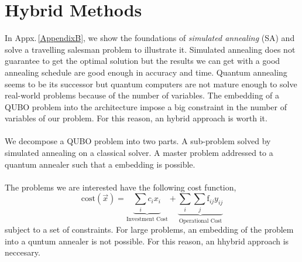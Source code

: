 
\chapter{Hybrid Methods} %

\label{Chapter3} %
In Appx.\,\ref{AppendixB}, we show the foundations of \textit{simulated annealing} (SA) and solve a travelling salesman problem to illustrate it. Simulated annealing does not guarantee to get the optimal solution but the results we can get with a good annealing schedule are good enough in accuracy and time. Quantum annealing seems to be its successor but quantum computers are not mature enough to solve real-world problems because of the number of variables. The embedding of a QUBO problem into the architecture impose a big constraint in the number of variables of our problem. For this reason, an hybrid approach is worth it.\\\\
We decompose a QUBO problem into two parts. A sub-problem solved by simulated annealing on a classical solver. A master problem addressed to a quantum annealer such that a embedding is possible.\\\\
The problems we are interested have the following cost function,
\begin{equation}
    \text{cost}(\vec{x}) = \underbrace{\sum_{i}c_{i}x_{i}}_{\text{Investment Cost}} + \underbrace{\sum_{i}\sum_{j}\text{f}_{ij}y_{ij}}_{\text{Operational Cost}}
\end{equation}
subject to a set of constraints.
For large problems, an embedding of the problem into a quntum annealer is not possible. For this reason, an hhybrid approach is neccesary. 
